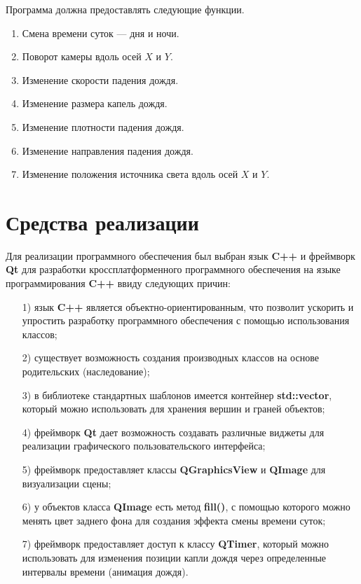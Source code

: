 Программа должна предоставлять следующие функции.

\begin{enumerate}
\item
Смена времени суток --- дня и ночи.
\item
Поворот камеры вдоль осей $X$ и $Y$.
\item
Изменение скорости падения дождя.
\item
Изменение размера капель дождя.
\item
Изменение плотности падения дождя.
\item
Изменение направления падения дождя.
\item
Изменение положения источника света вдоль осей $X$ и $Y$.
\end{enumerate}

\section{Средства реализации}

Для реализации программного обеспечения был выбран язык \textbf{C++} и фреймворк \textbf{Qt} для разработки кроссплатформенного программного обеспечения на языке программирования \textbf{C++} ввиду следующих причин:

\begin{enumerate}
\item[1)]
язык \textbf{C++} является объектно-ориентированным, что позволит ускорить и упростить разработку программного обеспечения с помощью использования классов;
\item[2)]
существует возможность создания производных классов на основе родительских (наследование);
\item[3)]
в библиотеке стандартных шаблонов имеется контейнер \textbf{std::vector}, который можно использовать для хранения вершин и граней объектов;
\item[4)]
фреймворк \textbf{Qt} дает возможность создавать различные виджеты для реализации графического пользовательского интерфейса;
\item[5)]
фреймворк предоставляет классы \textbf{QGraphicsView} и \textbf{QImage} для визуализации сцены;
\item[6)]
у объектов класса \textbf{QImage} есть метод \textbf{fill()}, с помощью которого можно менять цвет заднего фона для создания эффекта смены времени суток;
\item[7)]
фреймворк предоставляет доступ к классу \textbf{QTimer}, который можно использовать для изменения позиции капли дождя через определенные интервалы времени (анимация дождя).
\end{enumerate}


